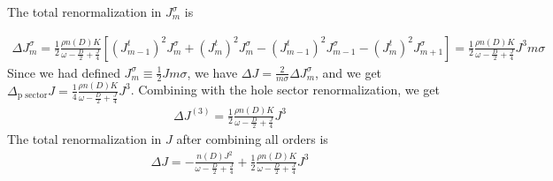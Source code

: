 \documentclass[reprint,prb,superscriptaddress]{revtex4-2}
\begin{document}
The total renormalization in  \(J^\sigma_m\) is
\begin{widetext}
\begin{equation}\begin{aligned}
	\Delta J^\sigma_m = \frac{1}{2}\frac{\rho n(D) K}{\omega - \frac{D}{2} + \frac{J}{4}}\left[\left( J^t_{m-1} \right)^2 J^\sigma_m + \left( J^t_m \right)^2 J^\sigma_m - \left( J^t_{m-1} \right)^2 J^\sigma_{m-1} - \left(J^t_m\right)^2 J^\sigma_{m+1} \right] = \frac{1}{2}\frac{\rho n(D) K}{\omega - \frac{D}{2} + \frac{J}{4}}J^3 m \sigma
\end{aligned}\end{equation}
Since we had defined \(J^\sigma_m \equiv \frac{1}{2}J m \sigma\), we have \(\Delta J = \frac{2}{m\sigma}\Delta J^\sigma_m\), and we get \(\Delta_\text{p sector} J = \frac{1}{4}\frac{\rho n(D) K}{\omega - \frac{D}{2} + \frac{J}{4}}J^3\).
Combining with the hole sector renormalization, we get
\begin{equation}\begin{aligned}
	\Delta J^{(3)} = \frac{1}{2}\frac{\rho n(D) K}{\omega - \frac{D}{2} + \frac{J}{4}}J^3
\end{aligned}\end{equation}
The total renormalization in \(J\) after combining all orders is
\begin{equation}\begin{aligned}
	\Delta J = -\frac{n(D) J^2}{\omega - \frac{D}{2} + \frac{J}{4}} + \frac{1}{2}\frac{\rho n(D) K}{\omega - \frac{D}{2} + \frac{J}{4}}J^3
\end{aligned}\end{equation}
\end{widetext}



\end{document}
